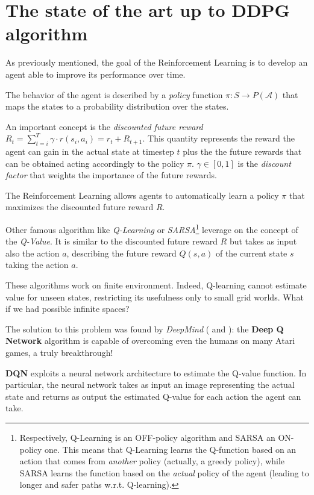 \documentclass[10pt,a4paper]{scrartcl}
\begin{document}
\section{The state of the art up to DDPG algorithm}

As 	previously mentioned, the goal of the Reinforcement Learning is to develop an agent able to improve its performance over time.
 
The behavior of the agent is described by a \textit{policy} function $ \pi:S \rightarrow P(\mathcal{A}) $ that maps the states to a probability distribution over the states. 

An important concept is the \textit{discounted future reward} $ R_t = \sum_{t=i}^{T} \gamma \cdot r(s_i, a_i) = r_t + R_{t+1} $. This quantity represents the reward the agent can gain in the actual state at timestep $ t $ plus the the future rewards that can be obtained acting accordingly to the policy $ \pi $. $ \gamma \in [0,1]$ is the \textit{discount factor} that weights the importance of the future rewards.

The Reinforcement Learning allows agents to automatically learn a policy $ \pi $ that maximizes the discounted future reward $ R $.

Other famous algorithm like \textit{Q-Learning} or \textit{SARSA}\footnote{Respectively, Q-Learning is an OFF-policy algorithm and SARSA an ON-policy one. This means that Q-Learning learns the Q-function based on an action that comes from \textit{another} policy (actually, a greedy policy), while SARSA learns the function based on the \textit{actual} policy of the agent (leading to longer and safer paths w.r.t. Q-learning).} leverage on the concept of the \textit{Q-Value}. It is similar to the discounted future reward $ R $ but takes as input also the action $ a $, describing the future reward $ Q(s,a) $ of the current state $ s $ taking the action $ a $. 

These algorithms work on finite environment. Indeed, Q-learning cannot estimate value for unseen states, restricting its usefulness only to small grid worlds. What if we had possible infinite spaces?

The solution to this problem was found by \textit{DeepMind} (\cite{Mnih2013PlayingAW} and \cite{mnih2015humanlevel}): the \textbf{Deep Q Network} algorithm is capable of overcoming even the humans on many Atari games, a truly breakthrough!

\textbf{DQN} exploits a neural network architecture to estimate the Q-value function. In particular, the neural network takes as input an image representing the actual state and returns as output the estimated Q-value for each action the agent can take.
\end{document}
